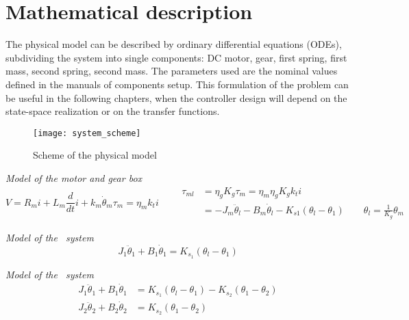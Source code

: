 \section{Mathematical description}
\label{sec:math_description}

The physical model can be described by ordinary differential equations (ODEs), subdividing the system into single components: DC motor, gear, first spring, first mass, second spring, second mass. The parameters used are the nominal values defined in the manuals of components setup. This formulation of the problem can be useful in the following chapters, when the controller design will depend on the state-space realization or on the transfer functions.
\begin{figure*}[h]
	\centering
	\texttt{[image: system\_scheme]}
	\caption{Scheme of the physical model}
\end{figure*}

\noindent \textit{Model of the motor and gear box}
\begin{subequations}
	\begin{equation}
		V = R_m i + L_m \frac{d}{dt}i + k_m \dot{\theta}_m
	\end{equation}
	\begin{equation}
		\tau_m = \eta_m k_t i
	\end{equation}
	\begin{equation}
		\begin{split}
			\qquad
			\tau_{ml} &= \eta_g K_g \tau_m = \eta_m \eta_g K_g k_t i \\
			&= -J_m \ddot{\theta}_l - B_m \dot{\theta}_l - K_{s1} ( \theta_l - \theta_1 )
			\qquad 
			\theta_l = \frac {1}{K_g} \theta_m
		\end{split}
	\end{equation}
	\label{fig:model_equations}
\end{subequations}

\noindent \textit{Model of the \onedof\ system}
\begin{equation}
	J_1 \ddot{\theta}_1 + B_1 \dot{\theta}_1 = K_{s_1} ( \theta_l - \theta_1 )
\end{equation}

\noindent \textit{Model of the \twodof\ system}
\begin{subequations}
	\begin{align}
		J_1 \ddot{\theta}_1 + B_1 \dot{\theta}_1 &= K_{s_1} ( \theta_l - \theta_1 ) - K_{s_2} ( \theta_1 - \theta_2 ) \\
		J_2 \ddot{\theta}_2 + B_2 \dot{\theta}_2 &= K_{s_2} ( \theta_1 - \theta_2 )
	\end{align}
\end{subequations}

